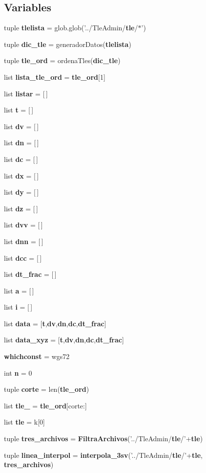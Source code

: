 \subsection*{\-Variables}
\begin{DoxyCompactItemize}
\item 
tuple {\bf tlelista} = glob.\-glob('../\-Tle\-Admin/{\bf tle}/$\ast$')
\item 
tuple {\bf dic\-\_\-tle} = generador\-Datos({\bf tlelista})
\item 
tuple {\bf tle\-\_\-ord} = ordena\-Tles({\bf dic\-\_\-tle})
\item 
list {\bf lista\-\_\-tle\-\_\-ord} = {\bf tle\-\_\-ord}[1]
\item 
list {\bf listar} = [$\,$]
\item 
list {\bf t} = [$\,$]
\item 
list {\bf dv} = [$\,$]
\item 
list {\bf dn} = [$\,$]
\item 
list {\bf dc} = [$\,$]
\item 
list {\bf dx} = [$\,$]
\item 
list {\bf dy} = [$\,$]
\item 
list {\bf dz} = [$\,$]
\item 
list {\bf dvv} = [$\,$]
\item 
list {\bf dnn} = [$\,$]
\item 
list {\bf dcc} = [$\,$]
\item 
list {\bf dt\-\_\-frac} = [$\,$]
\item 
list {\bf a} = [$\,$]
\item 
list {\bf i} = [$\,$]
\item 
list {\bf data} = [{\bf t},{\bf dv},{\bf dn},{\bf dc},{\bf dt\-\_\-frac}]
\item 
list {\bf data\-\_\-xyz} = [{\bf t},{\bf dv},{\bf dn},{\bf dc},{\bf dt\-\_\-frac}]
\item 
{\bf whichconst} = wgs72
\item 
int {\bf n} = 0
\item 
tuple {\bf corte} = len({\bf tle\-\_\-ord})
\item 
list {\bf tle\-\_} = {\bf tle\-\_\-ord}[corte\-:]
\item 
list {\bf tle} = k[0]
\item 
tuple {\bf tres\-\_\-archivos} = {\bf \-Filtra\-Archivos}('../\-Tle\-Admin/{\bf tle}/'+{\bf tle})
\item 
tuple {\bf linea\-\_\-interpol} = {\bf interpola\-\_\-3sv}('../\-Tle\-Admin/{\bf tle}/'+{\bf tle}, {\bf tres\-\_\-archivos})

\end{DoxyCompactItemize}
